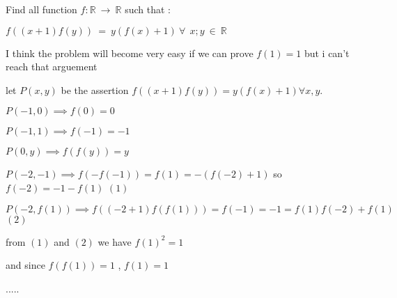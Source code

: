 \begin{solution}
	\begin{tcolorbox}\begin{italicized}Find all function $ f : \mathbb{R} \ \to \ \mathbb{R}$ such that :

   $ f((x + 1)f(y)) \ = \ y (f(x) + 1) \ \forall \ \ x ; y \ \in \ \mathbb{R}$

 I think the problem will become very easy if we can prove $ f(1) = 1$ but i can't reach that arguement \end{italicized}\end{tcolorbox}

let $ P(x,y)$ be the assertion $ f((x + 1)f(y)) = y(f(x) + 1) \forall x,y$.

$ P( - 1,0)\implies f(0) = 0$

$ P( - 1, 1)\implies f( - 1) = - 1$

$ P(0,y)\implies f(f(y)) = y$

$ P( - 2, - 1)\implies f( - f( - 1)) = f(1) = - (f( - 2) + 1)$ so $ f( - 2) = - 1 - f(1)$ $ (1)$

$ P( - 2,f(1))\implies f(( - 2 + 1)f(f(1))) = f( - 1) = - 1 = f(1)f( - 2) + f(1)$  $ (2)$

from $ (1)$ and $ (2)$ we have $ f(1)^2 = 1$

and since $ f(f(1)) = 1$ , $ f(1) = 1$

.....

 
\end{solution}



